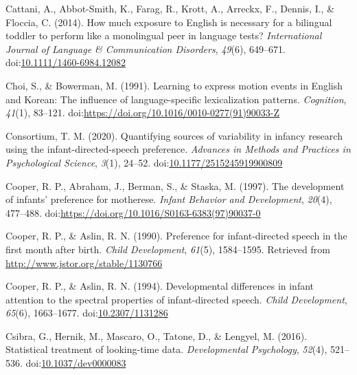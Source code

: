 \documentclass[,man,floatsintext]{apa6}
\begin{document}
\leavevmode\hypertarget{ref-cattani_2014}{}%
Cattani, A., Abbot-Smith, K., Farag, R., Krott, A., Arreckx, F., Dennis, I., \& Floccia, C. (2014). How much exposure to English is necessary for a bilingual toddler to perform like a monolingual peer in language tests? \emph{International Journal of Language \& Communication Disorders}, \emph{49}(6), 649--671. doi:\href{https://doi.org/10.1111/1460-6984.12082}{10.1111/1460-6984.12082}

\leavevmode\hypertarget{ref-choi_1991}{}%
Choi, S., \& Bowerman, M. (1991). Learning to express motion events in English and Korean: The influence of language-specific lexicalization patterns. \emph{Cognition}, \emph{41}(1), 83--121. doi:\href{https://doi.org/https://doi.org/10.1016/0010-0277(91)90033-Z}{https://doi.org/10.1016/0010-0277(91)90033-Z}

\leavevmode\hypertarget{ref-manybabies_consortium_2020}{}%
Consortium, T. M. (2020). Quantifying sources of variability in infancy research using the infant-directed-speech preference. \emph{Advances in Methods and Practices in Psychological Science}, \emph{3}(1), 24--52. doi:\href{https://doi.org/10.1177/2515245919900809}{10.1177/2515245919900809}

\leavevmode\hypertarget{ref-cooper_1997}{}%
Cooper, R. P., Abraham, J., Berman, S., \& Staska, M. (1997). The development of infants' preference for motherese. \emph{Infant Behavior and Development}, \emph{20}(4), 477--488. doi:\href{https://doi.org/https://doi.org/10.1016/S0163-6383(97)90037-0}{https://doi.org/10.1016/S0163-6383(97)90037-0}

\leavevmode\hypertarget{ref-cooper_1990}{}%
Cooper, R. P., \& Aslin, R. N. (1990). Preference for infant-directed speech in the first month after birth. \emph{Child Development}, \emph{61}(5), 1584--1595. Retrieved from \url{http://www.jstor.org/stable/1130766}

\leavevmode\hypertarget{ref-cooper_1994}{}%
Cooper, R. P., \& Aslin, R. N. (1994). Developmental differences in infant attention to the spectral properties of infant-directed speech. \emph{Child Development}, \emph{65}(6), 1663--1677. doi:\href{https://doi.org/10.2307/1131286}{10.2307/1131286}

\leavevmode\hypertarget{ref-csibra_2016}{}%
Csibra, G., Hernik, M., Mascaro, O., Tatone, D., \& Lengyel, M. (2016). Statistical treatment of looking-time data. \emph{Developmental Psychology}, \emph{52}(4), 521--536. doi:\href{https://doi.org/10.1037/dev0000083}{10.1037/dev0000083}
\end{document}

